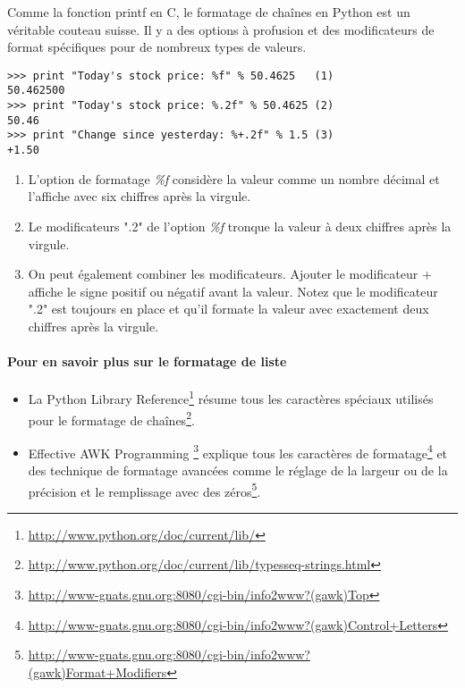 Comme la fonction printf en C, le formatage de chaînes en Python est un véritable couteau suisse. Il y a des options à profusion et des modificateurs de format spécifiques pour de nombreux types de valeurs.

\begin{example}
\begin{lstlisting}
>>> print "Today's stock price: %f" % 50.4625   (1)
50.462500
>>> print "Today's stock price: %.2f" % 50.4625 (2)
50.46
>>> print "Change since yesterday: %+.2f" % 1.5 (3)
+1.50
\end{lstlisting}
\end{example}

\begin{enumerate}
\item L'option de formatage \emph{\%f} considère la valeur comme un nombre décimal et
    l'affiche avec six chiffres après la virgule.
\item Le modificateurs ".2" de l'option \emph{\%f} tronque la valeur à deux chiffres
    après la virgule.
\item On peut également combiner les modificateurs. Ajouter le modificateur +
    affiche le signe positif ou négatif avant la valeur. Notez que le
    modificateur ".2" est toujours en place et qu'il formate la valeur avec
    exactement deux chiffres après la virgule.
\end{enumerate}

\paragraph{Pour en savoir plus sur le formatage de liste}
\begin{itemize}
\item{La Python Library Reference\footnote{\url{http://www.python.org/doc/current/lib/}} résume
    tous les caractères spéciaux utilisés pour le formatage de chaînes\footnote{\url{http://www.python.org/doc/current/lib/typesseq-strings.html}}.}
\item{Effective AWK Programming \footnote{\url{http://www-gnats.gnu.org:8080/cgi-bin/info2www?(gawk)Top}} explique tous les caractères de formatage\footnote{\url{http://www-gnats.gnu.org:8080/cgi-bin/info2www?(gawk)Control+Letters}} et des technique de formatage avancées comme le réglage de la largeur ou de la précision et le remplissage avec des zéros\footnote{\url{http://www-gnats.gnu.org:8080/cgi-bin/info2www?(gawk)Format+Modifiers}}.}
\end{itemize}

